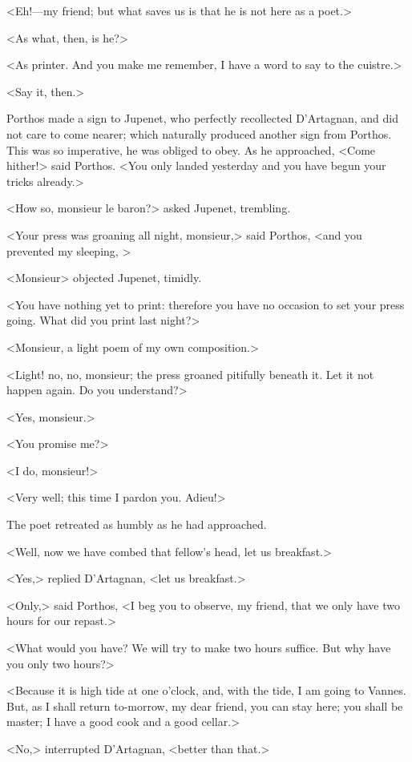 <Eh!—my friend; but what saves us is that he is not here as a poet.>

<As what, then, is he?>

<As printer. And you make me remember, I have a word to say to the cuistre.>

<Say it, then.>

Porthos made a sign to Jupenet, who perfectly recollected D'Artagnan, and did not care to come nearer; which naturally produced another sign from Porthos. This was so imperative, he was obliged to obey. As he approached, <Come hither!> said Porthos. <You only landed yesterday and you have begun your tricks already.>

<How so, monsieur le baron?> asked Jupenet, trembling.

<Your press was groaning all night, monsieur,> said Porthos, <and you prevented my sleeping, >

<Monsieur\longdash> objected Jupenet, timidly.

<You have nothing yet to print: therefore you have no occasion to set your press going. What did you print last night?>

<Monsieur, a light poem of my own composition.>

<Light! no, no, monsieur; the press groaned pitifully beneath it. Let it not happen again. Do you understand?>

<Yes, monsieur.>

<You promise me?>

<I do, monsieur!>

<Very well; this time I pardon you. Adieu!>

The poet retreated as humbly as he had approached.

<Well, now we have combed that fellow's head, let us breakfast.>

<Yes,> replied D'Artagnan, <let us breakfast.>

<Only,> said Porthos, <I beg you to observe, my friend, that we only have two hours for our repast.>

<What would you have? We will try to make two hours suffice. But why have you only two hours?>

<Because it is high tide at one o'clock, and, with the tide, I am going to Vannes. But, as I shall return to-morrow, my dear friend, you can stay here; you shall be master; I have a good cook and a good cellar.>

<No,> interrupted D'Artagnan, <better than that.>


